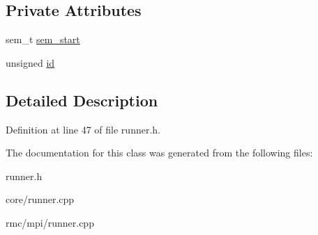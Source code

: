\subsection*{Private Attributes}
\begin{CompactItemize}
\item 
\hypertarget{classRunner_4b0827d5df2df632db4ab71dd55e81b2}{
sem\_\-t \hyperlink{classRunner_4b0827d5df2df632db4ab71dd55e81b2}{sem\_\-start}}
\label{classRunner_4b0827d5df2df632db4ab71dd55e81b2}

\item 
\hypertarget{classRunner_1989c1f8e0b0b54ad2e60a341007e59d}{
unsigned \hyperlink{classRunner_1989c1f8e0b0b54ad2e60a341007e59d}{id}}
\label{classRunner_1989c1f8e0b0b54ad2e60a341007e59d}

\end{CompactItemize}


\subsection{Detailed Description}




Definition at line 47 of file runner.h.

The documentation for this class was generated from the following files:\begin{CompactItemize}
\item 
runner.h\item 
core/runner.cpp\item 
rmc/mpi/runner.cpp\end{CompactItemize}
